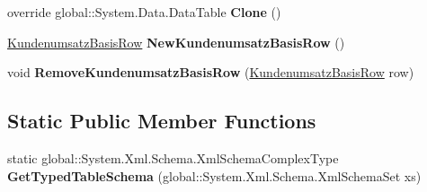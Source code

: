 \begin{DoxyCompactItemize}
\item 
override global\+::\+System.\+Data.\+Data\+Table {\bfseries Clone} ()\hypertarget{class_products_1_1_data_1_1ds_sage_1_1_kundenumsatz_basis_data_table_a20cbe27342789dcf98c5c6c62458cb2d}{}\label{class_products_1_1_data_1_1ds_sage_1_1_kundenumsatz_basis_data_table_a20cbe27342789dcf98c5c6c62458cb2d}

\item 
\hyperlink{class_products_1_1_data_1_1ds_sage_1_1_kundenumsatz_basis_row}{Kundenumsatz\+Basis\+Row} {\bfseries New\+Kundenumsatz\+Basis\+Row} ()\hypertarget{class_products_1_1_data_1_1ds_sage_1_1_kundenumsatz_basis_data_table_ab21e057ac4beb3c1ad6f4d87801f651e}{}\label{class_products_1_1_data_1_1ds_sage_1_1_kundenumsatz_basis_data_table_ab21e057ac4beb3c1ad6f4d87801f651e}

\item 
void {\bfseries Remove\+Kundenumsatz\+Basis\+Row} (\hyperlink{class_products_1_1_data_1_1ds_sage_1_1_kundenumsatz_basis_row}{Kundenumsatz\+Basis\+Row} row)\hypertarget{class_products_1_1_data_1_1ds_sage_1_1_kundenumsatz_basis_data_table_a9f395112fe4faba7b189568115f5d38f}{}\label{class_products_1_1_data_1_1ds_sage_1_1_kundenumsatz_basis_data_table_a9f395112fe4faba7b189568115f5d38f}

\end{DoxyCompactItemize}
\subsection*{Static Public Member Functions}
\begin{DoxyCompactItemize}
\item 
static global\+::\+System.\+Xml.\+Schema.\+Xml\+Schema\+Complex\+Type {\bfseries Get\+Typed\+Table\+Schema} (global\+::\+System.\+Xml.\+Schema.\+Xml\+Schema\+Set xs)\hypertarget{class_products_1_1_data_1_1ds_sage_1_1_kundenumsatz_basis_data_table_a874d919f2c88b5c08ef036ad34ccf592}{}\label{class_products_1_1_data_1_1ds_sage_1_1_kundenumsatz_basis_data_table_a874d919f2c88b5c08ef036ad34ccf592}

\end{DoxyCompactItemize}
